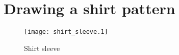 \documentclass{article}
\begin{document}
\section*{Drawing a shirt pattern}

\begin{figure}[htb]
\begin{center}
\texttt{[image: shirt\_sleeve.1]}
\caption{Shirt sleeve}
\end{center}
\end{figure}
\end{document}
